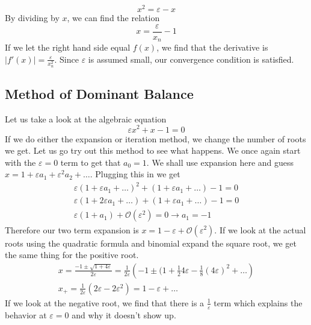 \documentclass{article}
\begin{document}
\begin{equation*}
    x^2=\varepsilon-x
\end{equation*}
By dividing by $x$, we can find the relation 
\begin{equation*}
    x=\frac{\varepsilon}{x_n}-1
\end{equation*}
If we let the right hand side equal $f(x)$, we find that the derivative is $|f'(x)|=\frac{\varepsilon}{x_n^2}$. Since $\varepsilon$ is assumed small, our convergence condition is satisfied.

\subsection{Method of Dominant Balance}
Let us take a look at the algebraic equation 
\begin{equation*}
    \varepsilon x^2+x-1=0
\end{equation*}
If we do either the expansion or iteration method, we change the number of roots we get. Let us go try out this method to see what happens. We once again start with the $\varepsilon=0$ term to get that $a_0=1$. We shall use expansion here and guess $x=1+\varepsilon a_1+\varepsilon^2 a_2+\ldots$. Plugging this in we get 
\begin{equation*}
    \begin{split}
        \varepsilon(1+\varepsilon a_1+\ldots)^2+(1+\varepsilon a_1+\ldots)-1=0 \\
        \varepsilon(1+2\varepsilon a_1+\ldots)+(1+\varepsilon a_1+\ldots)-1=0 \\
        \varepsilon(1+a_1)+\mathcal{O}(\varepsilon^2)=0 \rightarrow a_1=-1
    \end{split}
\end{equation*}
Therefore our two term expansion is $x=1-\varepsilon +\mathcal{O}(\varepsilon^2)$. If we look at the actual roots using the quadratic formula and binomial expand the square root, we get the same thing for the positive root.
\begin{equation*}
    \begin{split}
        x=\frac{-1\pm \sqrt{1+4\varepsilon}}{2\varepsilon} = \frac{1}{2\varepsilon}\left(-1 \pm (1+\frac{1}{2}4\varepsilon - \frac{1}{8}(4\varepsilon)^2 +\ldots \right) \\
        x_{+} =\frac{1}{2\varepsilon}(2\varepsilon-2\varepsilon^2) = 1-\varepsilon+\ldots
    \end{split}
\end{equation*}
If we look at the negative root, we find that there is a $\frac{1}{\varepsilon}$ term which explains the behavior at $\varepsilon=0$ and why it doesn't show up.
\end{document}
